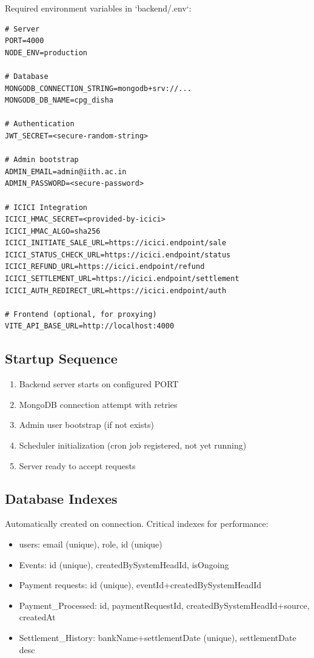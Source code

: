 \documentclass[12pt,a4paper]{article}
\begin{document}
Required environment variables in `backend/.env`:
\begin{lstlisting}
# Server
PORT=4000
NODE_ENV=production

# Database
MONGODB_CONNECTION_STRING=mongodb+srv://...
MONGODB_DB_NAME=cpg_disha

# Authentication
JWT_SECRET=<secure-random-string>

# Admin bootstrap
ADMIN_EMAIL=admin@iith.ac.in
ADMIN_PASSWORD=<secure-password>

# ICICI Integration
ICICI_HMAC_SECRET=<provided-by-icici>
ICICI_HMAC_ALGO=sha256
ICICI_INITIATE_SALE_URL=https://icici.endpoint/sale
ICICI_STATUS_CHECK_URL=https://icici.endpoint/status
ICICI_REFUND_URL=https://icici.endpoint/refund
ICICI_SETTLEMENT_URL=https://icici.endpoint/settlement
ICICI_AUTH_REDIRECT_URL=https://icici.endpoint/auth

# Frontend (optional, for proxying)
VITE_API_BASE_URL=http://localhost:4000
\end{lstlisting}

\subsection{Startup Sequence}
\begin{enumerate}
  \item Backend server starts on configured PORT
  \item MongoDB connection attempt with retries
  \item Admin user bootstrap (if not exists)
  \item Scheduler initialization (cron job registered, not yet running)
  \item Server ready to accept requests
\end{enumerate}

\subsection{Database Indexes}
Automatically created on connection. Critical indexes for performance:
\begin{itemize}
  \item users: email (unique), role, id (unique)
  \item Events: id (unique), createdBySystemHeadId, isOngoing
  \item Payment requests: id (unique), eventId+createdBySystemHeadId
  \item Payment\_Processed: id, paymentRequestId, createdBySystemHeadId+source, createdAt
  \item Settlement\_History: bankName+settlementDate (unique), settlementDate desc
\end{itemize}
\end{document}
